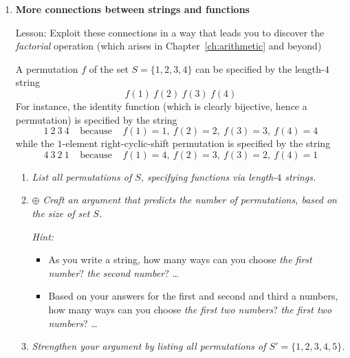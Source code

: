 {\begin{enumerate}
\begin{enumerate}
  \item
{\em Prove that $h(x)$ is a {\em surjection} from $\N^+$ to $\N^+$.}

  \item
{\em Prove that the preceding assertions are as strong as possible, in the sense that:
    \begin{enumerate}
    \item
Neither $f(x)$ nor $g(x)$ is a {\em surjection} from $\N^+$ to $\N^+$.
    \item
$h(x)$ is not an {\em injection} from $\N^+$ to $\N^+$.
    \end{enumerate} }
      
  \item {}
{\em Prove that $h(x)$ is a ``post-inverse" to both $f(x)$ and $g(x)$, in the sense that applying $h$ ``undoes" an earlier application of either $f$ or $g$.  In detail, for all $x \in \N^+$:
\[ h(f(x)) \ \ = \ \ h(g(x)) \ \ = \ \ x \]
In other words, both $f \circ h$ and $g \circ h$ are the identity function on $\N^+$. }
  \end{enumerate}

\item
{\bf More connections between strings and functions}

{\sc Lesson:} Exploit these connections in a way that leads you to discover the {\em factorial} operation (which arises in Chapter~\ref{ch:arithmetic} and beyond)

\smallskip

A permutation $f$ of the set $S = \{1,2,3,4\}$ can be specified by the length-$4$ string
\[ f(1) \ f(2) \ f(3) \ f(4) \]
For instance, the identity function (which is clearly bijective, hence a permutation) is specified by the string
\[ 1 \ 2 \ 3 \ 4 \ \ \ \ \ \mbox{because} \ \ \ \ \ f(1)=1, \ f(2)=2, \ f(3) =3, \ f(4)=4 \]
while the $1$-element right-cyclic-shift permutation is specified by the string
\[ 4 \ 3 \ 2 \ 1 \ \ \ \ \ \mbox{because} \ \ \ \ \ f(1)=4, \ f(2)=3, \ f(3) =2, \ f(4)=1\]
  \begin{enumerate}
  \item
{\em List all permutations of $S$, specifying functions via length-$4$ strings.}
  \item
$\oplus$
{\em Craft an argument that predicts the number of permutations, based on the size of set $S$.}

\smallskip

{\em Hint:}
\begin{itemize}
\item
As you write a string, how many ways can you choose {\em the first number}? {\em the second number}? \ldots
\item
Based on your answers for the first and second and third a numbers, how many ways can you choose {\em the first two numbers}? {\em the first two numbers}? \ldots
\end{itemize}
  \item
{\em Strengthen your argument by listing all permutations of  $S' =  \{1,2,3,4,5\}$.}


\end{enumerate}
\end{enumerate}}
